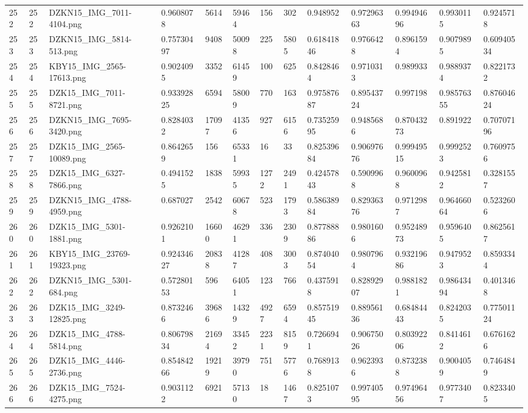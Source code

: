 \documentclass[11pt, a4paper, twoside]{report}
\begin{document}
\begin{longtable}[c]{@{}lllllllllllll@{}}
252 & 252 & DZKN15\_IMG\_7011-4104.png & 0.9608078 & 5614 & 59464 & 156 & 302 & 0.948952 & 0.97296363 & 0.99494696 & 0.9930115 & 0.9245718 \\
253 & 253 & DZKN15\_IMG\_5814-513.png & 0.75730497 & 9408 & 50098 & 225 & 5805 & 0.61841846 & 0.9766428 & 0.8961594 & 0.9079895 & 0.60940534 \\
254 & 254 & KBY15\_IMG\_2565-17613.png & 0.9024095 & 3352 & 61459 & 100 & 625 & 0.8428464 & 0.9710313 & 0.989933 & 0.9889374 & 0.8221732 \\
255 & 255 & DZK15\_IMG\_7011-8721.png & 0.93392825 & 6594 & 58009 & 770 & 163 & 0.97587687 & 0.89543724 & 0.997198 & 0.98576355 & 0.87604624 \\
256 & 256 & DZKN15\_IMG\_7695-3420.png & 0.8284032 & 17097 & 41356 & 927 & 6156 & 0.73525995 & 0.9485686 & 0.87043273 & 0.891922 & 0.70707196 \\
257 & 257 & DZK15\_IMG\_2565-10089.png & 0.8642659 & 156 & 65331 & 16 & 33 & 0.82539684 & 0.90697676 & 0.99949515 & 0.9992523 & 0.7609756 \\
258 & 258 & DZK15\_IMG\_6327-7866.png & 0.4941525 & 1838 & 59935 & 1272 & 2491 & 0.42457843 & 0.5909968 & 0.9600968 & 0.9425812 & 0.3281557 \\
259 & 259 & DZKN15\_IMG\_4788-4959.png & 0.687027 & 2542 & 60678 & 523 & 1793 & 0.58638984 & 0.82936376 & 0.9712987 & 0.96466064 & 0.5232606 \\
260 & 260 & DZK15\_IMG\_5301-1881.png & 0.9262101 & 16600 & 46291 & 336 & 2309 & 0.87788886 & 0.9801606 & 0.95248973 & 0.9596405 & 0.8625617 \\
261 & 261 & KBY15\_IMG\_23769-19323.png & 0.92434627 & 20838 & 41287 & 408 & 3003 & 0.87404054 & 0.9807964 & 0.93219686 & 0.9479523 & 0.8593344 \\
262 & 262 & DZKN15\_IMG\_5301-684.png & 0.57280153 & 596 & 64051 & 123 & 766 & 0.4375918 & 0.82892907 & 0.9881821 & 0.98643494 & 0.4013468 \\
263 & 263 & DZK15\_IMG\_3249-12825.png & 0.8732466 & 39686 & 14329 & 4927 & 6594 & 0.85751945 & 0.88956136 & 0.68484443 & 0.8242035 & 0.77501124 \\
264 & 264 & DZK15\_IMG\_4788-5814.png & 0.80679834 & 21694 & 33452 & 2231 & 8159 & 0.7266941 & 0.90675026 & 0.80392206 & 0.8414612 & 0.6761626 \\
265 & 265 & DZK15\_IMG\_4446-2736.png & 0.85484266 & 19219 & 39790 & 751 & 5776 & 0.7689138 & 0.9623936 & 0.8732388 & 0.9004059 & 0.7464849 \\
266 & 266 & DZK15\_IMG\_7524-4275.png & 0.9031122 & 6921 & 57130 & 18 & 1467 & 0.8251073 & 0.99740595 & 0.97496456 & 0.9773407 & 0.8233405 \\

\end{longtable}
\end{document}
